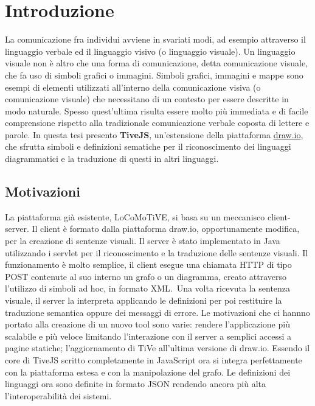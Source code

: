 ﻿\chapter{Introduzione}

    La comunicazione fra individui avviene in svariati modi, ad esempio attraverso il linguaggio verbale ed il linguaggio visivo (o linguaggio visuale).
    \newline
    Un linguaggio visuale non è altro che una forma di comunicazione, detta comunicazione visuale, che fa uso di simboli grafici o immagini. Simboli grafici, immagini e mappe sono esempi di elementi utilizzati all'interno della comunicazione visiva (o comunicazione visuale) che necessitano di un contesto per essere descritte in modo naturale. Spesso quest'ultima risulta essere molto più immediata e di facile comprensione rispetto alla tradizionale comunicazione verbale coposta di lettere e parole.
    \newline
    In questa tesi presento \textbf{TiveJS}, un'estensione della piattaforma \href{https://www.draw.io/}{draw.io}, che sfrutta  simboli e  definizioni sematiche per il riconoscimento dei linguaggi diagrammatici e la traduzione di questi in altri linguaggi.

    \section{Motivazioni}
        La piattaforma già esistente, LoCoMoTiVE, si basa su un meccanisco client-server.
        \newline
        Il client è formato dalla piattaforma draw.io, opportunamente modifica, per la creazione di sentenze visuali.
        Il server è stato implementato in Java utilizzando i servlet per il riconoscimento e la traduzione delle sentenze visuali.
        Il funzionamento è molto semplice, il client esegue una chiamata HTTP di tipo POST contenute al suo interno un grafo o un diagramma, creato attraverso l'utilizzo di simboli ad hoc, in formato XML.~Una volta ricevuta la sentenza visuale, il server la interpreta applicando le definizioni per poi restituire la traduzione semantica oppure dei messaggi di errore.
        \newline
        Le motivazioni che ci hannno portato alla creazione di un nuovo tool sono varie: rendere l'applicazione più scalabile e più veloce limitando l'interazione con il server a semplici accessi a pagine statiche; l'aggiornamento di TiVe all'ultima versione di draw.io.
        Essendo il core di TiveJS scritto completamente in JavaScript ora si integra perfettamente con la piattaforma estesa e con la manipolazione del grafo.
        Le definizioni dei linguaggi ora sono definite in formato JSON rendendo ancora più alta l'interoperabilità dei sistemi. 

